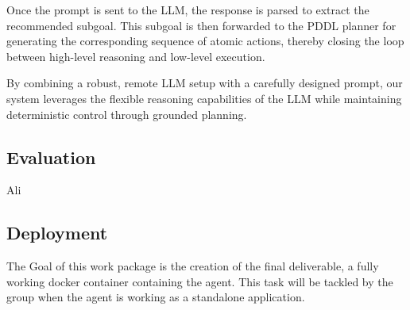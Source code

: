 \documentclass{article}
\begin{document}
Once the prompt is sent to the LLM, the response is parsed to extract the recommended subgoal. This subgoal is then forwarded to the PDDL planner for generating the corresponding sequence of atomic actions, thereby closing the loop between high-level reasoning and low-level execution.

By combining a robust, remote LLM setup with a carefully designed prompt, our system leverages the flexible reasoning capabilities of the LLM while maintaining deterministic control through grounded planning.



\subsection{Evaluation}
Ali

\subsection{Deployment}
The Goal of this work package is the creation of the final deliverable, a fully working docker container containing the agent. 
This task will be tackled by the group when the agent is working as a standalone application.
\end{document}
